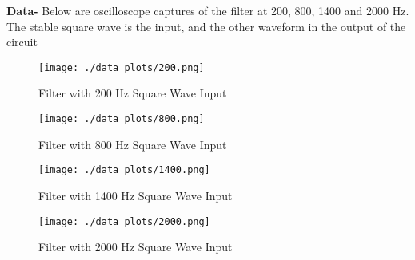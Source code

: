 \documentclass[12pt]{article}
\begin{document}
\textbf{Data-} Below are oscilloscope captures of the filter at 200, 800, 1400 and 2000 Hz. The stable square wave is the input, and the other waveform in the output of the circuit
\FloatBarrier
\begin{figure}[h!]
\begin{center}
 \texttt{[image: ./data\_plots/200.png]}
\end{center}
\caption{Filter with 200 Hz Square Wave Input}
\end{figure}
\begin{figure}[h!]
\begin{center}
 \texttt{[image: ./data\_plots/800.png]}
\end{center}
\caption{Filter with 800 Hz Square Wave Input}
\end{figure}
\begin{figure}[h!]
\begin{center}
 \texttt{[image: ./data\_plots/1400.png]}
\end{center}
\caption{Filter with 1400 Hz Square Wave Input}
\end{figure}
\begin{figure}[h!]
\begin{center}
 \texttt{[image: ./data\_plots/2000.png]}
\end{center}
\caption{Filter with 2000 Hz Square Wave Input}
\end{figure}
\FloatBarrier
\end{document}
